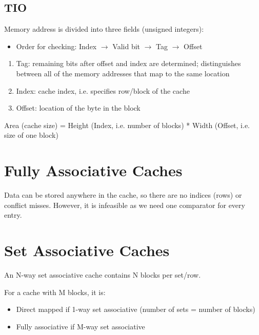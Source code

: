\subsection{TIO}
Memory address is divided into three fields (unsigned integers):
\begin{itemize}
    \item Order for checking: Index $\rightarrow$ Valid bit $\rightarrow$ Tag $\rightarrow$ Offset
\end{itemize}
\begin{enumerate}
    \item Tag: remaining bits after offset and index are determined; distinguishes between all of the memory addresses that map to the same location
    \item Index: cache index, i.e. specifies row/block of the cache
    \item Offset: location of the byte in the block
\end{enumerate}

Area (cache size) = Height (Index, i.e. number of blocks) * Width (Offset, i.e. size of one block)

\section{Fully Associative Caches}
Data can be stored anywhere in the cache, so there are no indices (rows) or conflict misses. However, it is infeasible as we need one comparator for every entry.

\section{Set Associative Caches}
An N-way set associative cache contains N blocks per set/row.

For a cache with M blocks, it is:
\begin{itemize}
    \item Direct mapped if 1-way set associative (number of sets = number of blocks)
    \item Fully associative if M-way set associative
\end{itemize}

